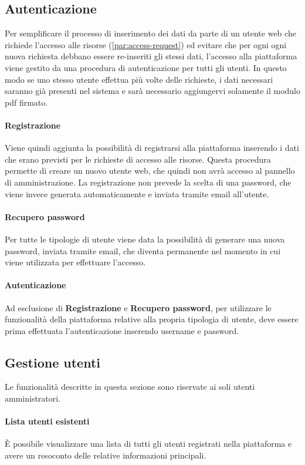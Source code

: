 \subsection{Autenticazione}
Per semplificare il processo di inserimento dei dati da parte di un utente web
che richiede l'accesso alle risorse (\ref{par:access-request}) ed evitare che
per ogni ogni nuova richiesta debbano essere re-inseriti gli stessi dati, l'accesso
alla piattaforma viene gestito da una procedura di autenticazione per tutti gli
utenti. In questo modo se uno stesso utente effettua più volte delle richieste,
i dati necessari saranno già presenti nel sistema e sarà necessario aggiungervi
solamente il modulo pdf firmato.

\paragraph{Registrazione}
Viene quindi aggiunta la possibilità di registrarsi alla piattaforma inserendo i
dati che erano previsti per le richieste di accesso alle risorse. Questa procedura
permette di creare un nuovo utente web, che quindi non avrà accesso al pannello
di amministrazione. La registrazione non prevede la scelta di una password, che
viene invece generata automaticamente e inviata tramite email all'utente.

\paragraph{Recupero password}
Per tutte le tipologie di utente viene data la possibilità di generare una nuova
password, inviata tramite email, che diventa permanente nel momento in cui
viene utilizzata per effettuare l'accesso.

\paragraph{Autenticazione}
Ad esclusione di \textbf{Registrazione} e \textbf{Recupero password}, per utilizzare
le funzionalità della piattaforma relative alla propria tipologia di utente,
deve essere prima effettuata l'autenticazione inserendo username e password.


\subsection{Gestione utenti}
Le funzionalità descritte in questa sezione sono riservate ai soli utenti
amministratori.

\paragraph{Lista utenti esistenti}
È possibile visualizzare una lista di tutti gli utenti registrati nella piattaforma
e avere un resoconto delle relative informazioni principali.

